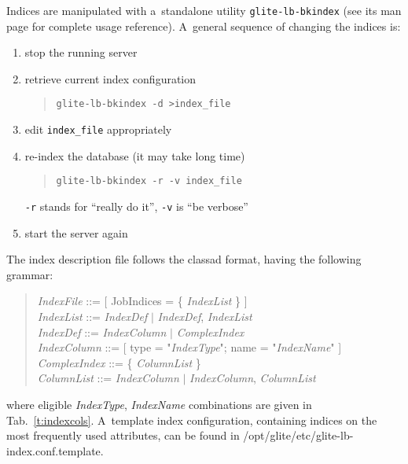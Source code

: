 Indices are manipulated with a~standalone utility \verb'glite-lb-bkindex'
(see its man page for complete usage reference).
A~general sequence of changing the indices is:
\begin{enumerate}
\item stop the running server
\item retrieve current index configuration
\begin{quote}
\verb'glite-lb-bkindex -d >index_file'
\end{quote}
\item edit \verb'index_file' appropriately
\item re-index the database (it may take long time)
\begin{quote}
\verb'glite-lb-bkindex -r -v index_file'
\end{quote}
\verb'-r' stands for ``really do it'', \verb'-v' is ``be verbose''
\item start the server again
\end{enumerate}

The index description file follows the classad format, having the following grammar:
\begin{quote}
\emph{IndexFile} ::= [ JobIndices = \{ \emph{IndexList} \} ] \\
\emph{IndexList} ::= \emph{IndexDef} $|$ \emph{IndexDef}, \emph{IndexList} \\
\emph{IndexDef} ::= \emph{IndexColumn} $|$ \emph{ComplexIndex} \\
\emph{IndexColumn} ::= [ type = "\emph{IndexType}"; name = "\emph{IndexName}" ]\\
\emph{ComplexIndex} ::= \{ \emph{ColumnList} \} \\
\emph{ColumnList} ::= \emph{IndexColumn} $|$ \emph{IndexColumn}, \emph{ColumnList}
\end{quote}

where eligible \emph{IndexType}, \emph{IndexName} combinations are given
in Tab.~\ref{t:indexcols}.
A~template index configuration, containing indices on the most frequently
used attributes, can be found in /opt/glite/etc/glite-lb-index.conf.template.


